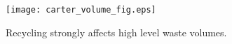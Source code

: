 \begin{figure}[htbp!]
  \begin{center}
    \texttt{[image: carter\_volume\_fig.eps]}
  \end{center}
  \caption{Recycling strongly affects high level waste volumes\cite{carter_us_2011}.}
  \label{fig:carter_volume}
\end{figure}
